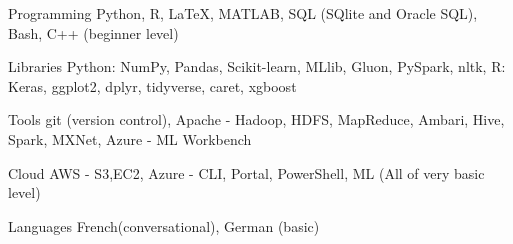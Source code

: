 

\begin{cvskills}

  \cvskill
    {Programming} %
    {Python, R, LaTeX, MATLAB, SQL (SQlite and Oracle SQL), Bash, C++ (beginner level)} %
    
  \cvskill
    {Libraries} %
    {Python: NumPy, Pandas, Scikit-learn, MLlib, Gluon, PySpark, nltk,  R: Keras, ggplot2, dplyr, tidyverse, caret, xgboost} %

  \cvskill
    {Tools} %
    {git (version control), Apache - Hadoop, HDFS, MapReduce, Ambari, Hive, Spark, MXNet, Azure - ML Workbench} %
 
  \cvskill
    {Cloud} %
    {AWS - S3,EC2, Azure - CLI, Portal, PowerShell, ML (All of very basic level)} %
       
  \cvskill
    {Languages} %
    {French(conversational), German (basic)} %


\end{cvskills}
